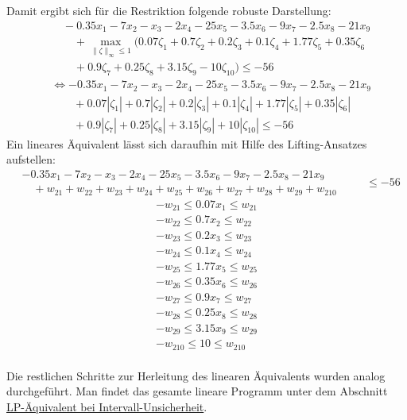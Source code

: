 \documentclass[a4paper,12pt]{article}
\begin{document}
Damit ergibt sich f\"ur die Restriktion folgende robuste Darstellung:
\[
\begin{aligned}
    &\quad-0.35x_1 - 7x_2 - x_3 - 2x_4 - 25x_5 - 3.5x_6 - 9x_7 - 2.5x_8 - 21x_9 \\
    &\qquad + \max_{\|\zeta\|_\infty \leq 1} \big( 0.07\zeta_1 + 0.7\zeta_2 + 0.2\zeta_3 + 0.1\zeta_4 + 1.77\zeta_5 +  0.35\zeta_6\\
    &\qquad + 0.9\zeta_7 + 0.25\zeta_8 + 3.15\zeta_9 - 10\zeta_{10} \big) \leq -56
\end{aligned}
\]
\[
\begin{aligned}
    &\Leftrightarrow -0.35x_1 - 7x_2 - x_3 - 2x_4 - 25x_5 - 3.5x_6 - 9x_7 - 2.5x_8 - 21x_9 \\
    &\qquad + 0.07|\zeta_1| + 0.7|\zeta_2| + 0.2|\zeta_3| + 0.1|\zeta_4| + 1.77|\zeta_5| + 0.35|\zeta_6| \\
    &\qquad + 0.9|\zeta_7| + 0.25|\zeta_8| + 3.15|\zeta_9| + 10|\zeta_{10}| \leq -56
\end{aligned}
\]
\newpage
Ein lineares \"Aquivalent l\"asst sich daraufhin mit Hilfe des Lifting-Ansatzes aufstellen:
\[
\begin{aligned}
    &-0.35x_1 - 7x_2 - x_3 - 2x_4 - 25x_5 - 3.5x_6 - 9x_7 - 2.5x_8 - 21x_9 \\
    &\quad + w_{21} + w_{22} + w_{23} + w_{24} + w_{25} + w_{26} + w_{27}+ w_{28}+ w_{29}+ w_{210}
\end{aligned}
\begin{aligned}
    &\quad \leq -56
\end{aligned}
\]
\[
\begin{aligned} 
    -w_{21} \leq 0.07x_1 \leq w_{21} \\
    -w_{22} \leq 0.7x_2 \leq w_{22} \\
    -w_{23} \leq 0.2x_3 \leq w_{23} \\
    -w_{24} \leq 0.1x_4 \leq w_{24} \\
    -w_{25} \leq 1.77x_5 \leq w_{25} \\
    -w_{26} \leq 0.35x_6 \leq w_{26} \\
    -w_{27} \leq 0.9x_7 \leq w_{27} \\
    -w_{28} \leq 0.25x_8 \leq w_{28} \\
    -w_{29} \leq 3.15x_9 \leq w_{29} \\
    -w_{210} \leq 10 \leq w_{210} \\
\end{aligned}
\]

Die restlichen Schritte zur Herleitung des linearen \"Aquivalents wurden analog durchgef\"uhrt. Man findet das gesamte lineare Programm unter dem Abschnitt \hyperref[sec:lp-equivalent-interval]{LP-\"Aquivalent bei Intervall-Unsicherheit}.
\end{document}
